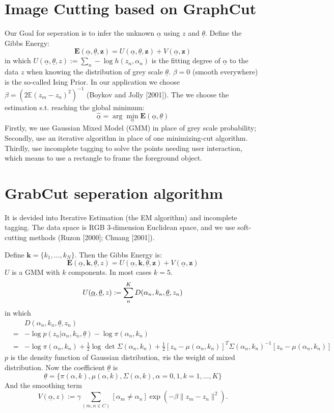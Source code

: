 \documentclass[a4paper, 11pt, nofonts, nocap, fancyhdr, hyperref, UTF8]{ctexart}
\begin{document}
\section{Image Cutting based on GraphCut}
Our Goal for seperation is to infer the unknown $\underline{\alpha}$ using $z$ and $\underline{\theta}$. Define the Gibbs Energy:
$$
\textbf{E}(\underline{\alpha},\underline{\theta},\textbf{z}) = U(\underline{\alpha},\underline{\theta},\textbf{z})+V(\underline{\alpha},\textbf{z})
$$
in which 
$U(\underline{\alpha},\underline{\theta},z) := \sum_n -\log h(z_n, \alpha_n)$
is the fitting degree of $\underline{\alpha}$ to the data $z$ when knowing the distribution of grey scale $\underline{\theta}$.
$\beta = 0$ (smooth everywhere) is the so-called Ising Prior. In our application we choose $\beta = (2\mathbb{E}(z_m-z_n)^2)^{-1}$ (Boykov and Jolly [2001]).
The we choose the estimation s.t. reaching the global minimum:
$$
\hat{\underline{\alpha}} = \arg \min \limits_{\underline{\alpha}} \textbf{E}(\underline{\alpha},\underline{\theta})
$$
Firstly, we use Gaussian Mixed Model (GMM) in place of grey scale probability; Secondly, use an iterative algorithm in place of one minimizing-cut algorithm. Thirdly, use incomplete tagging to solve the points needing user interaction, which means to use a rectangle to frame the foreground object.

\section{GrabCut seperation algorithm}
It is devided into Iterative Estimation (the EM algorithm) and incomplete tagging. The data space is RGB 3-dimension Euclidean space, and we use soft-cutting methods (Ruzon [2000]; Chuang [2001]).

Define $\textbf{k} = \{k_1,\ldots,k_N\}$. Then the Gibbs Energy is:
$$
\textbf{E}(\underline{\alpha},\textbf{k},\underline{\theta},z) = U(\underline{\alpha},\textbf{k},\underline{\theta},\textbf{z})+V(\underline{\alpha},\textbf{z})
$$
$U$ is a GMM with $k$ components. In most cases $k=5$. 
$$
U(\underline{\alpha},\underline{\theta},z) := \sum \limits_n \limits^K D(\alpha_n,k_n,\underline{\theta},z_n) \\
$$
in which
\begin{eqnarray}
&&D(\alpha_n,k_n,\underline{\theta},z_n)\nonumber\\
&=&-\log p(z_n|\alpha_n,k_n,\underline{\theta})-\log\pi(\alpha_n,k_n) \nonumber\\
&=& -\log \pi(\alpha_n,k_n)+\frac{1}{2}\log\det \Sigma(\alpha_n,k_n)+\frac{1}{2}[z_n-\mu(\alpha_n,k_n)]^T\Sigma(\alpha_n,k_n)^{-1}[z_n-\mu(\alpha_n,k_n)]\nonumber
\end{eqnarray}
$p$ is the density function of Gaussian distribution, $\pi$is the weight of mixed distribution. Now the coefficient $\underline{\theta}$ is
$$
\underline{\theta} = \{\pi(\alpha,k), \mu(\alpha,k), \Sigma(\alpha,k), \alpha = 0,1, k = 1,\ldots,K\}
$$
And the smoothing term
$$
V(\underline{\alpha},z) := \gamma \sum_{(m,n \in C)} [\alpha_m \neq \alpha_n]  \exp (-\beta \|z_m - z_n\|^2).
$$
\end{document}
